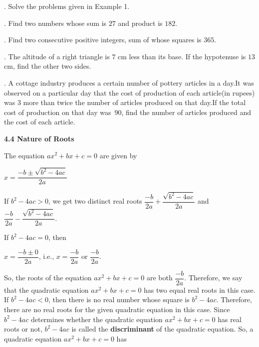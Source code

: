 \documentclass[11pt]{article}
\begin{document}
. Solve the problems given in Example 1.

\medskip

. Find two numbers whose sum is $27$ and product is $182$.

\medskip

. Find two consecutive positive integers, sum of whose squares is $365$.

\medskip

. The altitude of a right triangle is $7$ cm less than its base.
If the hypotenuse is $13$ cm, find the other two sides.

\medskip

. A cottage industry produces a certain number of pottery articles in a day.It was observed on a particular day that the cost of production of each article(in rupees) was $3$ more than twice the number of articles produced on that day.If the total cost of production on that day was \,90, find the number of articles produced and the cost of each article.

\medskip
\noindent\textcolor{chapterblue}{\large\textbf{4.4 Nature of Roots}}

\medskip

\noindent The equation $ax^2 + bx + c = 0$ are given by

\begin{center}
$x = \dfrac{-b \pm \sqrt{b^2 - 4ac}}{2a}$
\end{center}

If $b^2 - 4ac > 0$, we get two distinct real roots
$\dfrac{-b}{2a} + \dfrac{\sqrt{b^2 - 4ac}}{2a}$ and
$\dfrac{-b}{2a} - \dfrac{\sqrt{b^2 - 4ac}}{2a}$.

If $b^2 - 4ac = 0$, then

\begin{center}
$x = \dfrac{-b \pm 0}{2a}$, i.e., $x = \dfrac{-b}{2a}$ or $\dfrac{-b}{2a}$.
\end{center}
So, the roots of the equation $ax^2 + bx + c = 0$ are both $\dfrac{-b}{2a}$. Therefore, we say that the quadratic equation $ax^2 + bx + c = 0$ has two equal real roots in this case. If $b^2 - 4ac < 0$, then there is no real number whose square is $b^2 - 4ac$.
Therefore, there are no real roots for the given quadratic equation in this case. Since $b^2 - 4ac$ determines whether the quadratic equation $ax^2 + bx + c = 0$ has real roots or not, $b^2 - 4ac$ is called the \textbf{discriminant} of the quadratic equation. So, a quadratic equation $ax^2 + bx + c = 0$ has
\end{document}
